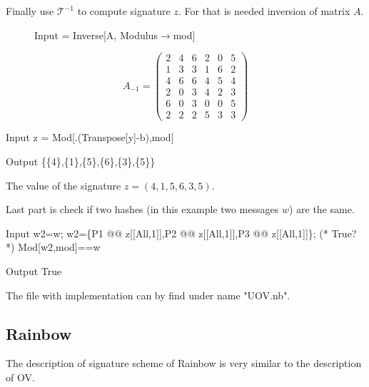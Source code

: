 \documentclass[thesis=M,english]{FITthesis}[2019/12/23]
\begin{document}
\bigskip
\noindent
Finally use $\mathcal{T}^{-1}$ to compute signature $z$. For that is needed inversion of matrix $A$.
\begin{figure}[h]
	\begin{minipage}{0.59\textwidth}
		\centering
\begin{mmaCell}[moredefined={A, mod}]{Input}
   = Inverse[A, Modulus\(\pmb{\to}\)mod]
\end{mmaCell}
	\end{minipage}
	\begin{minipage}{0.28\textwidth}
		\centering
		\begin{equation*}
A_{-1} = 
\begin{pmatrix}
2 & 4 & 6 & 2 & 0 & 5 \\
1 & 3 & 3 & 1 & 6 & 2 \\
4 & 6 & 6 & 4 & 5 & 4 \\
2 & 0 & 3 & 4 & 2 & 3 \\
6 & 0 & 3 & 0 & 0 & 5 \\
2 & 2 & 2 & 5 & 3 & 3
\end{pmatrix}
\end{equation*}
	\end{minipage}
\end{figure}
\begin{mmaCell}[moredefined={z, A, y, b, mod}]{Input}
  z = Mod[.(Transpose[y]-b),mod] 
\end{mmaCell}
\begin{mmaCell}{Output}
  \{\{4\},\{1\},\{5\},\{6\},\{3\},\{5\}\}
\end{mmaCell}
The value of the signature $z = (4,1,5,6,3,5)$.

\bigskip
\noindent
Last part is check if two hashes (in this example two messages $w$) are the same.
\begin{mmaCell}[moredefined={w2, w, P1, z, P2, P3, mod}]{Input}
  w2=w;
  w2=\{P1 @@ z[[All,1]],P2 @@ z[[All,1]],P3 @@ z[[All,1]]\};
  (* True? *)
  Mod[w2,mod]==w
\end{mmaCell}
\begin{mmaCell}[addtoindex=2]{Output}
  True
\end{mmaCell}

The file with implementation can by find under name "UOV.nb".

\subsection{Rainbow}
The description of signature scheme of Rainbow is very similar to the description of OV.
\end{document}
